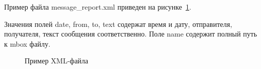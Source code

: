 Пример файла message\_report.xml приведен на рисунке~\ref{teresh_2:teresh_2}.

Значения полей date, from, to, text содержат время и дату, отправителя, получателя, текст сообщения соответственно. Поле name содержит полный путь к mbox файлу.

\begin{figure}[h!]
\caption{Пример XML-файла}
\label{teresh_2:teresh_2}
\end{figure}
